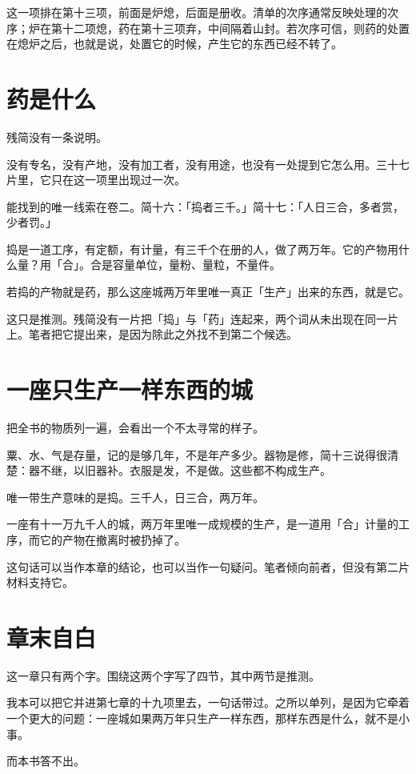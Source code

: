 这一项排在第十三项，前面是炉熄，后面是册收。清单的次序通常反映处理的次序；炉在第十二项熄，药在第十三项弃，中间隔着山封。若次序可信，则药的处置在熄炉之后，也就是说，处置它的时候，产生它的东西已经不转了。

\section{药是什么}

残简没有一条说明。

没有专名，没有产地，没有加工者，没有用途，也没有一处提到它怎么用。三十七片里，它只在这一项里出现过一次。

能找到的唯一线索在卷二。简十六：「捣者三千。」简十七：「人日三合，多者赏，少者罚。」

捣是一道工序，有定额，有计量，有三千个在册的人，做了两万年。它的产物用什么量？用「合」。合是容量单位，量粉、量粒，不量件。

若捣的产物就是药，那么这座城两万年里唯一真正「生产」出来的东西，就是它。

这只是推测。残简没有一片把「捣」与「药」连起来，两个词从未出现在同一片上。笔者把它提出来，是因为除此之外找不到第二个候选。

\section{一座只生产一样东西的城}

把全书的物质列一遍，会看出一个不太寻常的样子。

粟、水、气是存量，记的是够几年，不是年产多少。器物是修，简十三说得很清楚：器不继，以旧器补。衣服是发，不是做。这些都不构成生产。

唯一带生产意味的是捣。三千人，日三合，两万年。

一座有十一万九千人的城，两万年里唯一成规模的生产，是一道用「合」计量的工序，而它的产物在撤离时被扔掉了。

这句话可以当作本章的结论，也可以当作一句疑问。笔者倾向前者，但没有第二片材料支持它。

\section{章末自白}

这一章只有两个字。围绕这两个字写了四节，其中两节是推测。

我本可以把它并进第七章的十九项里去，一句话带过。之所以单列，是因为它牵着一个更大的问题：一座城如果两万年只生产一样东西，那样东西是什么，就不是小事。

而本书答不出。

